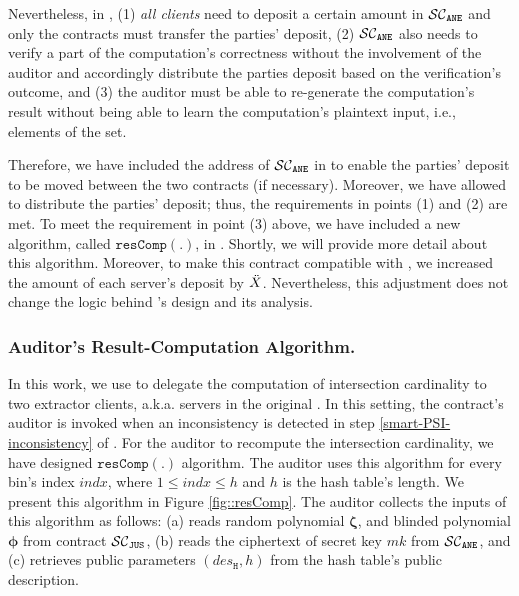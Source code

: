 Nevertheless, in \epsi, (1) \emph{all clients} need to deposit a certain amount in $\mathcal{SC}_{\mathtt{ANE}}$ and only the contracts must transfer the parties' deposit,  (2) $\mathcal{SC}_{\mathtt{ANE}}$ also needs to verify a part of the computation's correctness without the involvement of the auditor and accordingly distribute the parties deposit based on the verification's outcome,  and (3) the auditor must be able to re-generate the computation's result without being able to learn the computation's plaintext input, i.e., elements of the set. 

Therefore, we have included the address of $\mathcal{SC}_{\mathtt{ANE}}$ in \SCpc to enable the parties' deposit to be moved between the two contracts (if necessary). Moreover, we have allowed \SCpc to distribute the parties' deposit; thus, the requirements in points (1) and (2) are met. To meet the requirement in point (3) above, we have included a new algorithm, called $\mathtt{resComp}(.)$, in \SCpc.  Shortly, we will provide more detail about this algorithm. Moreover, to make this contract compatible with \epsi, we increased the amount of each server's deposit by  $\ddot{X}$. Nevertheless, this adjustment does not change the logic behind \SCpc's design and its analysis.  







\subsubsection{Auditor's Result-Computation Algorithm.}\label{sec::auditor-res-Comp}


In this work,  we use \SCpc to delegate the computation of intersection cardinality to two extractor clients, a.k.a. servers in the original \SCpc. In this setting, the contract's auditor is invoked when an inconsistency is detected in step \ref{smart-PSI-inconsistency} of \epsi. For the auditor to recompute the intersection cardinality, we have designed $\mathtt{resComp}(.)$ algorithm. The auditor uses this algorithm for every bin's index $indx$,  where $1\leq indx\leq h$ and $h$ is the hash table's length. We present this algorithm in Figure \ref{fig::resComp}.  The auditor collects the inputs of this algorithm as follows: (a)  reads random polynomial $\bm\zeta$, and blinded polynomial $\bm\phi$ from contract $\mathcal{SC}_{\mathtt{JUS}}$, (b) reads the ciphertext of secret key $mk$ from $\mathcal{SC}_{\mathtt{ANE}}$, and (c) retrieves public parameters $(des_{\mathtt{H}}, h)$ from the hash table's public description. 



